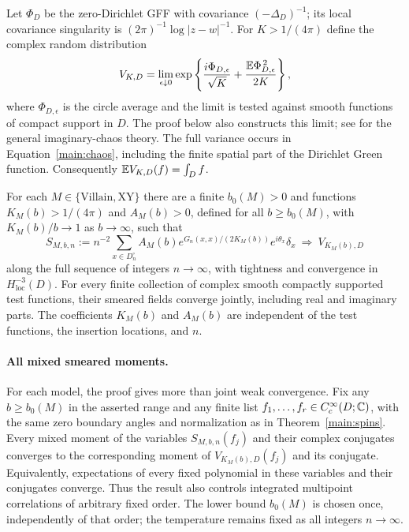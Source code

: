 Let $\Phi_D$ be the zero-Dirichlet GFF with covariance
$(-\Delta_D)^{-1}$; its local covariance singularity is
$(2\pi)^{-1}\log|z-w|^{-1}$.
For $K>1/(4\pi)$ define the complex random distribution
\begin{equation}\label{main:chaos}
 V_{K,D}=\lim_{\epsilon\downarrow0}
     \exp\left\{\frac{i\Phi_{D,\epsilon}}{\sqrt K}
                  +\frac{\mathbb E\Phi_{D,\epsilon}^{\,2}}{2K}\right\},
\end{equation}
where $\Phi_{D,\epsilon}$ is the circle average and the limit is tested
against smooth functions of compact support in $D$.  The proof below
also constructs this limit; see \citet{JunnilaSaksmanWebb2020}
for the general imaginary-chaos theory.  The full variance occurs in
Equation~\eqref{main:chaos}, including the finite spatial part of the
Dirichlet Green function.  Consequently
$\mathbb E V_{K,D}(f)=\int_D f$.

\begin{theorem}
\label{main:spins}
For each $M\in\{\mathrm{Villain},\mathrm{XY}\}$ there are a finite
$b_0(M)>0$ and functions $K_M(b)>1/(4\pi)$ and $A_M(b)>0$,
defined for all $b\ge b_0(M)$, with $K_M(b)/b\to1$ as $b\to\infty$,
such that
\begin{equation}\label{main:spin-limit}
 S_{M,b,n}:=n^{-2}\sum_{x\in D_n^\circ}
       A_M(b)e^{G_n(x,x)/(2K_M(b))}e^{i\theta_x}\delta_x
       \ \Longrightarrow\ V_{K_M(b),D}
\end{equation}
along the full sequence of integers $n\to\infty$, with tightness and
convergence in $H^{-3}_{\mathrm{loc}}(D)$.
For every finite collection of complex smooth compactly supported test
functions, their smeared fields converge jointly, including real and
imaginary parts.  The coefficients $K_M(b)$ and $A_M(b)$ are independent
of the test functions, the insertion locations, and $n$.
\end{theorem}

\paragraph{All mixed smeared moments.}
For each model, the proof gives more than joint weak convergence.
Fix any $b\ge b_0(M)$ in the asserted range and any finite list
$f_1,\ldots,f_r\in C_c^\infty(D;\mathbb C)$, with the same zero boundary
angles and normalization as in Theorem~\ref{main:spins}.  Every mixed
moment of the variables $S_{M,b,n}(f_j)$ and their complex conjugates
converges to the corresponding moment of $V_{K_M(b),D}(f_j)$ and its
conjugate.  Equivalently, expectations of every fixed polynomial in
these variables and their conjugates converge.  Thus the result also
controls integrated multipoint correlations of arbitrary fixed order.
The lower bound $b_0(M)$ is chosen once, independently of that order;
the temperature remains fixed as all integers $n\to\infty$.

